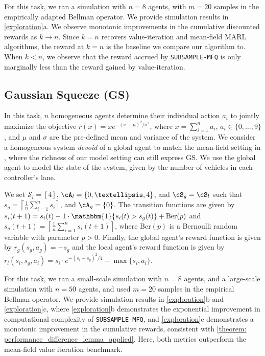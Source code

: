 \documentclass{article}
\theoremstyle{plain}
\theoremstyle{definition}
\def\ceil#1{\left\lceil #1 \right\rceil}
\begin{document}
For this task, we ran a simulation with $n=8$ agents, with $m=20$ samples in the empirically adapted Bellman operator. We provide simulation results in \cref{exploration}a. We observe monotonic improvements in the cumulative discounted rewards as $k\to n$. Since $k=n$ recovers value-iteration and mean-field MARL algorithms, the reward at $k=n$ is the baseline we compare our algorithm to. When $k<n$, we observe that the reward accrued by \texttt{SUBSAMPLE-MFQ} is only marginally less than the reward gained by value-iteration.

\subsection{Gaussian Squeeze (GS)}
    In this task, $n$ homogeneous agents determine their individual action $a_i$ to jointly maximize the objective $r(x) = xe^{-(x-\mu)^2/\sigma^2}$, where $x = \sum_{i=1}^n a_i$, $a_i \in \{0,\dots,9\}$, and $\mu$ and $\sigma$ are the pre-defined mean and variance of the system. We consider a homogeneous system \emph{devoid} of a global agent to match the mean-field setting in \citet{pmlr-v80-yang18d}, where the richness of our model setting can still express GS. We use the global agent to model the state of the system, given by the number of vehicles in each controller's lane. 
    
    We set $\mathcal{S}_l=[4]$, $\cA_l=\{0,\dots,4\}$, and $\cS_g=\cS_l$ such that $s_g=\ceil{\frac{1}{n}\sum_{i=1}^n s_i}$, and $\cA_g=\{0\}$. The transition functions are given by $s_i(t+1) = s_i(t) - 1\cdot\mathbbm{1}\{s_i(t)>s_g(t)\} + \mathrm{Ber}(p)$ and $s_g(t+1)=\ceil{\frac{1}{n}\sum_{i=1}^n s_i(t+1)}$, where $\mathrm{Ber}(p)$ is a Bernoulli random variable with parameter $p>0$. Finally, the global agent's reward function is given by $r_g(s_g,a_g) = -s_g$ and the local agent's reward function is given by $r_l(s_i,s_g,a_i) = s_i \cdot e^{-(s_i - s_g)^2/4} - \max\{s_i,a_i\}$. 
    
    For this task, we ran a small-scale simulation with $n=8$ agents, and a large-scale simulation with $n=50$ agents, and used $m=20$ samples in the empirical Bellman operator. We provide simulation results in \cref{exploration}b and \cref{exploration}c, where \cref{exploration}b demonstrates the exponential improvement in computational complexity of \texttt{SUBSAMPLE-MFQ}, and \cref{exploration}c demonstrates a monotonic improvement in the cumulative rewards,  consistent with \cref{theorem: performance_difference_lemma_applied}. Here, both metrics outperform the mean-field value iteration benchmark.
\end{document}
